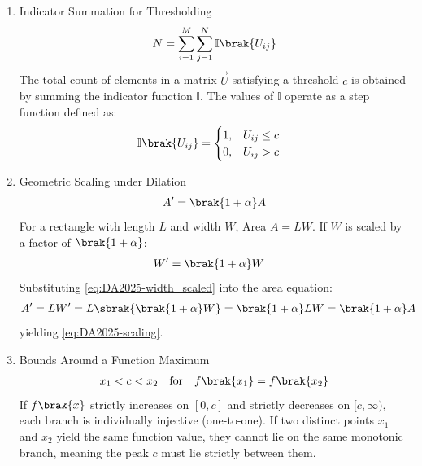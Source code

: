 \begin{enumerate}[label=\thesubsection.\arabic*, ref=\thesubsection.\theenumi]
	
	\item Indicator Summation for Thresholding
	\begin{align}
		N = \sum_{i=1}^M \sum_{j=1}^N \mathbb{I}\brak{U_{ij}} \label{eq:DA2025-threshold}
	\end{align}
	\solution
	The total count of elements in a matrix $\vec{U}$ satisfying a threshold $c$ is obtained by summing the indicator function $\mathbb{I}$. The values of $\mathbb{I}$ operate as a step function defined as:
	\begin{align}
		\mathbb{I}\brak{U_{ij}} &= {\begin{cases} 
				1, & U_{ij} \le c \\ 
				0, & U_{ij} > c 
		\end{cases}} \label{eq:DA2025-indicator_step}
	\end{align}
	
	\item Geometric Scaling under Dilation
	\begin{align}
		A' = \brak{1 + \alpha}A \label{eq:DA2025-scaling}
	\end{align}
	\solution
	For a rectangle with length $L$ and width $W$, Area $A = LW$. If $W$ is scaled by a factor of $\brak{1 + \alpha}$:
	\begin{align}
		W' &= \brak{1 + \alpha}W \label{eq:DA2025-width_scaled}
	\end{align}
	Substituting \eqref{eq:DA2025-width_scaled} into the area equation:
	\begin{align}
		A' &= L W' = L \sbrak{\brak{1 + \alpha}W} = \brak{1 + \alpha}LW = \brak{1 + \alpha}A
	\end{align}
	yielding \eqref{eq:DA2025-scaling}.
	
	\item Bounds Around a Function Maximum
	\begin{align}
		x_1 < c < x_2 \quad \text{for} \quad f\brak{x_1} = f\brak{x_2} \label{eq:DA2025-unimodal}
	\end{align}
	\solution
	If $f\brak{x}$ strictly increases on $[0, c]$ and strictly decreases on $[c, \infty)$, each branch is individually injective (one-to-one). If two distinct points $x_1$ and $x_2$ yield the same function value, they cannot lie on the same monotonic branch, meaning the peak $c$ must lie strictly between them.
	

\end{enumerate}
